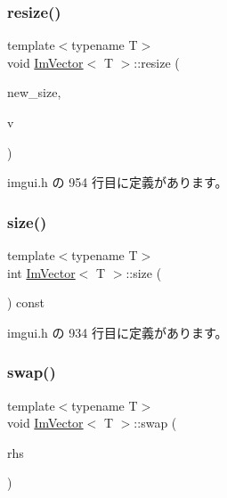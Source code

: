 \subsubsection{\texorpdfstring{resize()}{resize()}\hspace{0.1cm}{\footnotesize\ttfamily [2/2]}}
{\footnotesize\ttfamily template$<$typename T$>$ \\
void \mbox{\hyperlink{class_im_vector}{Im\+Vector}}$<$ T $>$\+::resize (\begin{DoxyParamCaption}\item[{int}]{new\+\_\+size,  }\item[{const T \&}]{v }\end{DoxyParamCaption})\hspace{0.3cm}{\ttfamily [inline]}}



 imgui.\+h の 954 行目に定義があります。

\mbox{\label{class_im_vector_a8c903ecb1aaee0601b6a8ad835a4a435}} 
\subsubsection{\texorpdfstring{size()}{size()}}
{\footnotesize\ttfamily template$<$typename T$>$ \\
int \mbox{\hyperlink{class_im_vector}{Im\+Vector}}$<$ T $>$\+::size (\begin{DoxyParamCaption}{ }\end{DoxyParamCaption}) const\hspace{0.3cm}{\ttfamily [inline]}}



 imgui.\+h の 934 行目に定義があります。

\mbox{\label{class_im_vector_afcec0d2a1e28aebe412b6efd06f0a77a}} 
\subsubsection{\texorpdfstring{swap()}{swap()}}
{\footnotesize\ttfamily template$<$typename T$>$ \\
void \mbox{\hyperlink{class_im_vector}{Im\+Vector}}$<$ T $>$\+::swap (\begin{DoxyParamCaption}\item[{\mbox{\hyperlink{class_im_vector}{Im\+Vector}}$<$ T $>$ \&}]{rhs }\end{DoxyParamCaption})\hspace{0.3cm}{\ttfamily [inline]}}



